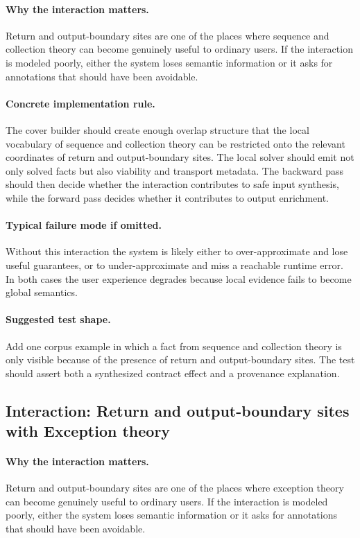 \documentclass[11pt]{report}
\theoremstyle{definition}
\theoremstyle{plain}
\begin{document}
\paragraph{Why the interaction matters.}
Return and output-boundary sites are one of the places where sequence and collection theory can become
genuinely useful to ordinary users. If the interaction is modeled poorly,
either the system loses semantic information or it asks for annotations that
should have been avoidable.

\paragraph{Concrete implementation rule.}
The cover builder should create enough overlap structure that the local
vocabulary of sequence and collection theory can be restricted onto the relevant
coordinates of return and output-boundary sites. The local solver should emit not only
solved facts but also viability and transport metadata. The backward pass
should then decide whether the interaction contributes to safe input
synthesis, while the forward pass decides whether it contributes to output
enrichment.

\paragraph{Typical failure mode if omitted.}
Without this interaction the system is likely either to over-approximate and
lose useful guarantees, or to under-approximate and miss a reachable runtime
error. In both cases the user experience degrades because local evidence
fails to become global semantics.

\paragraph{Suggested test shape.}
Add one corpus example in which a fact from sequence and collection theory is only
visible because of the presence of return and output-boundary sites. The test should
assert both a synthesized contract effect and a provenance explanation.

\subsection{Interaction: Return and output-boundary sites with Exception theory}

\paragraph{Why the interaction matters.}
Return and output-boundary sites are one of the places where exception theory can become
genuinely useful to ordinary users. If the interaction is modeled poorly,
either the system loses semantic information or it asks for annotations that
should have been avoidable.
\end{document}
